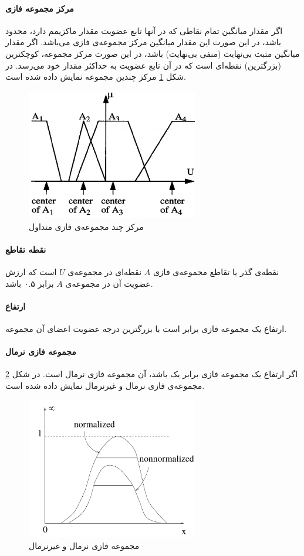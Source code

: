 \paragraph{مرکز مجموعه فازی}
اگر مقدار میانگین تمام نقاطی که در آنها تابع عضویت مقدار ماکزیمم دارد، محدود باشد، در این صورت این مقدار میانگین مرکز مجموعه‌ی فازی می‌باشد. اگر مقدار میانگین مثبت بی‌نهایت (منفی بی‌نهایت) باشد، در این صورت مرکز مجموعه، کوچکترین (بزرگترین) نقطه‌ای است که در آن تابع عضویت به حداکثر مقدار خود می‌رسد. در شکل 
\ref{fig:f_5}
مرکز چندین مجموعه نمایش داده شده است.
\begin{figure}[h]
	\centering 
	\includegraphics[width=75mm]{Images/Fig5.png}
	\vspace{-0.5cm}
	\caption{مرکز چند مجموعه‌ی فازی متداول}\label{fig:f_5}
\end{figure}
\paragraph{نقطه تقاطع}
نقطه‌ی گذر یا تقاطع 
مجموعه‌ی فازی $A$ نقطه‌ای در مجموعه‌ی $U$ است که ارزش عضویت آن در مجموعه‌ی $A$ برابر ۰.۵ باشد.
\paragraph{ارتفاع}
ارتفاع یک مجموعه فازی برابر است با بزرگترین درجه عضویت اعضای آن مجموعه.
\paragraph{مجموعه فازی نرمال}
اگر ارتفاع یک مجموعه فازی برابر یک باشد، آن مجموعه فازی نرمال است. در شکل 
\ref{fig:f_6}
مجموعه‌ی فازی نرمال و غیرنرمال نمایش داده شده است.
\begin{figure}[h]
	\centering 
	\includegraphics[width=75mm]{Images/Fig6.png}
		\vspace{-0.5cm}
	\caption{مجموعه فازی نرمال و غیرنرمال}\label{fig:f_6}
\end{figure}
